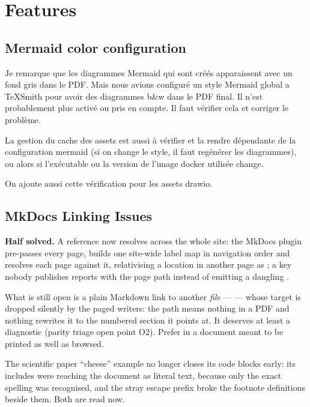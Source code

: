 \documentclass[a4paper,twoside]{article}
\begin{document}
\section{Features}
\subsection{Mermaid color configuration}
Je remarque que les diagrammes Mermaid qui sont créés apparaissent avec un fond gris dans le PDF. Mais nous avions configuré un style Mermaid global a TeXSmith pour avoir des diagrammes b\&w dans le PDF final. Il n'est probablement plus activé ou pris en compte. Il faut vérifier cela et corriger le problème.

La gestion du cache des assets est aussi à vérifier et la rendre dépendante de la configuration mermaid (si on change le style, il faut regénérer les diagrammes), ou alors si l'exécutable ou la version de l'image docker utilisée change.

On ajoute aussi cette vérification pour les assets drawio.
\subsection{MkDocs Linking Issues}
\textbf{Half solved.} A  reference now resolves across the whole site: the
 MkDocs plugin pre-passes every page, builds one site-wide label map
in navigation order and resolves each page against it, relativising a location
in another page as ; a key nobody publishes reports
 with the page path instead of emitting a dangling .

What is still open is a plain Markdown link to another \emph{file} ---
 --- whose target is dropped silently
by the paged writers: the  path means nothing in a PDF and nothing
rewrites it to the numbered section it points at. It deserves at least a
diagnostic (parity triage open point O2). Prefer  in a
document meant to be printed as well as browsed.

The scientific paper ``cheese'' example no longer closes its code blocks early:
its  includes were reaching the document as literal text, because
only the exact  spelling was recognised, and the stray \tscodeinline{;} escape
prefix broke the footnote definitions beside them. Both are read now.
\end{document}
